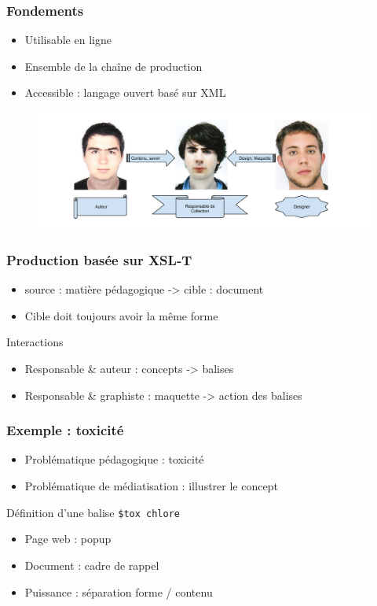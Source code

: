\begin{frame}
	\frametitle{Fondements}
	\begin{itemize}
		\item Utilisable en ligne
		\item Ensemble de la chaîne de production
		\item Accessible : langage ouvert basé sur XML
	\end{itemize}
	\begin{figure}
		\centering
		\includegraphics[scale=0.2]{resources/lesBGdeLaDOC.png}
	\end{figure}
\end{frame}

\begin{frame}
	\frametitle{Production basée sur XSL-T}
	\begin{itemize}
		\item source : matière pédagogique -> cible : document
		\item Cible doit toujours avoir la même forme
	\end{itemize}
	\begin{block}{Interactions}
	\begin{itemize}
		\item Responsable \& auteur : concepts -> balises
		\item Responsable \& graphiste : maquette -> action des balises
	\end{itemize}	
	\end{block}

\end{frame}

\begin{frame}
	\frametitle{Exemple : toxicité}
	\begin{itemize}
		\item Problématique pédagogique : toxicité
		\item Problématique de médiatisation : illustrer le concept
	\end{itemize}
	\begin{block}{Définition d'une balise}
			\texttt{\$tox chlore}
	\end{block}
	\begin{itemize}
		\item Page web : popup
		\item Document : cadre de rappel
		\item Puissance : séparation forme / contenu
	\end{itemize}

\end{frame}